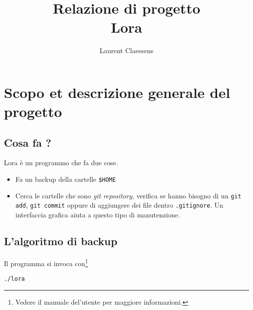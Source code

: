 \documentclass[a4paper,12pt]{article}
\newcommand{\info}[1]{\texttt{#1}}
\begin{document}
\title{Relazione di progetto\\Lora}
\author{Laurent Claessens}
\maketitle

\tableofcontents

\section{Scopo et descrizione generale del progetto}

\subsection{Cosa fa ?}

Lora è un programmo che fa due cose.
\begin{itemize}
    \item
        Fa un backup della cartelle \info{\$HOME}
    \item
        Cerca le cartelle che sono \emph{git repository}, verifica se hanno bisogno di un \info{git add}, \info{git commit} oppure di aggiungere dei file dentro \info{.gitignore}. Un interfaccia grafica aiuta a questo tipo di manutenzione.
\end{itemize}

\subsection{L'algoritmo di backup}

Il programma si invoca con\footnote{Vedere il manuale del'utente per maggiore informazioni.}
\begin{center}
      \info{./lora}
\end{center}
\end{document}
